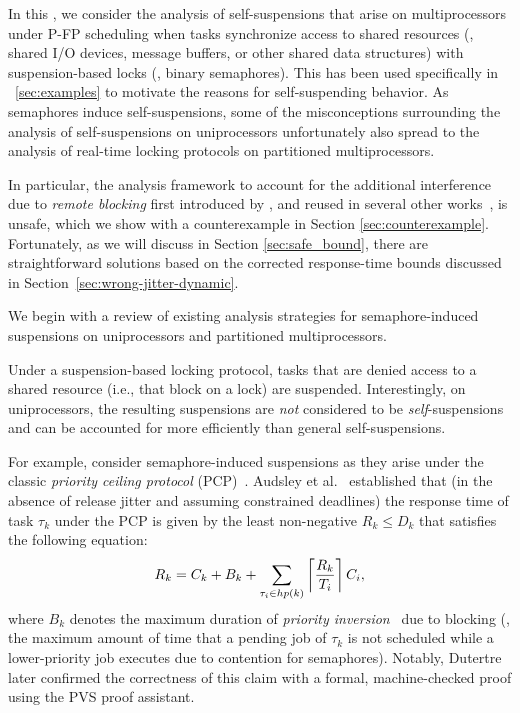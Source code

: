 \label{sec:syn}

In this \mysectionrefnormal{}, we consider the analysis of self-suspensions that arise on multiprocessors under P-FP scheduling when tasks synchronize access to shared resources (\eg, shared I/O devices, message buffers, or other shared data structures) with suspension-based locks (\eg, binary semaphores). This has been used specifically in \mysectionref{}~\ref{sec:examples} to motivate the reasons for self-suspending behavior. 
As semaphores induce self-suspensions, some of the misconceptions surrounding the analysis of self-suspensions on uniprocessors unfortunately also spread to the analysis of  real-time locking protocols on partitioned multiprocessors.

In particular, the analysis framework to account for the additional interference due to \emph{remote blocking} first introduced by \cite{lakshmanan-2009}, and reused in several other works~\cite{zeng-2011,bbb-2013,yang-2013,kim-2014,han-2014,carminati-2014,yang-2014},  is unsafe, which we show with a counterexample in Section \ref{sec:counterexample}. Fortunately, as we will discuss in Section \ref{sec:safe_bound}, there are straightforward solutions based on the corrected response-time bounds discussed in Section~\ref{sec:wrong-jitter-dynamic}.

We begin with a review of existing analysis strategies for semaphore-induced suspensions on uniprocessors and partitioned multiprocessors. 
 

\label{sec:sem-uni}

Under a suspension-based locking protocol, tasks that are denied access to a shared resource (i.e., that block on a lock) are suspended. Interestingly, on uniprocessors, the resulting suspensions are \emph{not} considered to be \emph{self}-suspensions and can be accounted for more efficiently than general self-suspensions.

For example, consider semaphore-induced suspensions as they arise under the classic \emph{priority ceiling protocol} (PCP)~\cite{SRL:90}. Audsley et al.~\cite{audsley-1993} established that (in the absence of release jitter and assuming constrained deadlines) the response time of task $\tau_k$ under the PCP is given by the least non-negative $R_k \leq D_k$ that satisfies the following equation:
\begin{equation}
R_k = C_k+ B_k+\sum_{\tau_i \in hp(k)}\left\lceil{\frac{R_k}{T_i}}\right\rceil C_i,
\label{eq:classic-pcp-rta}
\end{equation}
where $B_k$ denotes the maximum duration of \emph{priority inversion}~\cite{SRL:90} due to blocking (\ie, the maximum amount of time that a pending job of $\tau_k$ is not scheduled while a lower-priority job executes due to contention for semaphores). Notably, Dutertre~\cite{Du:99} later confirmed the correctness of this claim  with a formal, machine-checked proof using the PVS proof assistant. 


